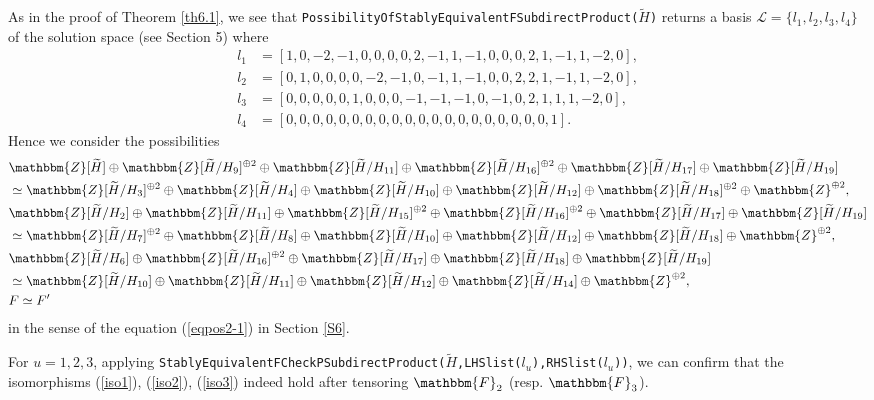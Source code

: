 \documentclass{amsart}
\theoremstyle{plain}
\theoremstyle{definition}
\theoremstyle{remark}
\newcommand{\bZ}{\mathbbm{Z}}\newcommand{\bQ}{\mathbbm{Q}}
\newcommand{\bF}{\mathbbm{F}}\newcommand{\bP}{\mathbbm{P}}
\begin{document}
As in the proof of Theorem \ref{th6.1}, we see that 
{\tt PossibilityOfStablyEquivalentFSubdirectProduct($\widetilde{H}$)} 
returns a basis $\mathcal{L}=\{l_1,l_2,l_3,l_4\}$ of the solution space 
(see Section 5) where 
\begin{align*}
l_1&=[ 1, 0, -2, -1, 0, 0, 0, 0, 2, -1, 1, -1, 0, 0, 0, 2, 1, -1, 1, -2, 0 ],\\
l_2&=[ 0, 1, 0, 0, 0, 0, -2, -1, 0, -1, 1, -1, 0, 0, 2, 2, 1, -1, 1, -2, 0 ],\\
l_3&=[ 0, 0, 0, 0, 0, 1, 0, 0, 0, -1, -1, -1, 0, -1, 0, 2, 1, 1, 1, -2, 0 ],\\
l_4&=[ 0, 0, 0, 0, 0, 0, 0, 0, 0, 0, 0, 0, 0, 0, 0, 0, 0, 0, 0, 0, 1 ].
\end{align*}
Hence we consider the possibilities 
\begin{align}
&\bZ[\widetilde{H}]\oplus \bZ[\widetilde{H}/H_9]^{\oplus 2}\oplus \bZ[\widetilde{H}/H_{11}]\oplus \bZ[\widetilde{H}/H_{16}]^{\oplus 2}\oplus \bZ[\widetilde{H}/H_{17}]\oplus \bZ[\widetilde{H}/H_{19}]\label{iso1}\\
&\simeq \bZ[\widetilde{H}/H_3]^{\oplus 2}\oplus \bZ[\widetilde{H}/H_4]\oplus \bZ[\widetilde{H}/H_{10}]\oplus \bZ[\widetilde{H}/H_{12}]\oplus \bZ[\widetilde{H}/H_{18}]^{\oplus 2}\oplus \bZ^{\oplus 2},\nonumber\\
&\bZ[\widetilde{H}/H_2]\oplus \bZ[\widetilde{H}/H_{11}]\oplus \bZ[\widetilde{H}/H_{15}]^{\oplus 2}\oplus \bZ[\widetilde{H}/H_{16}]^{\oplus 2}\oplus \bZ[\widetilde{H}/H_{17}]\oplus \bZ[\widetilde{H}/H_{19}]\label{iso2}\\
&\simeq \bZ[\widetilde{H}/H_7]^{\oplus 2}\oplus \bZ[\widetilde{H}/H_8]\oplus \bZ[\widetilde{H}/H_{10}]\oplus \bZ[\widetilde{H}/H_{12}]\oplus \bZ[\widetilde{H}/H_{18}]\oplus \bZ^{\oplus 2},\nonumber\\
&\bZ[\widetilde{H}/H_6]\oplus \bZ[\widetilde{H}/H_{16}]^{\oplus 2}\oplus \bZ[\widetilde{H}/H_{17}]\oplus \bZ[\widetilde{H}/H_{18}]\oplus \bZ[\widetilde{H}/H_{19}]\label{iso3}\\
&\simeq \bZ[\widetilde{H}/H_{10}]\oplus \bZ[\widetilde{H}/H_{11}]\oplus \bZ[\widetilde{H}/H_{12}]\oplus \bZ[\widetilde{H}/H_{14}]\oplus \bZ^{\oplus 2},\nonumber\\
&F\simeq F^\prime\nonumber
\end{align}
in the sense of the equation (\ref{eqpos2-1}) in Section \ref{S6}. 

For $u=1,2,3$, applying 
{\tt StablyEquivalentFCheckPSubdirectProduct($\widetilde{H}$,LHSlist($l_u$),RHSlist($l_u$))}, 
we can confirm that the isomorphisms 
(\ref{iso1}), (\ref{iso2}), (\ref{iso3}) indeed hold 
after tensoring $\bF_2$ (resp. $\bF_3$). 
\end{document}
